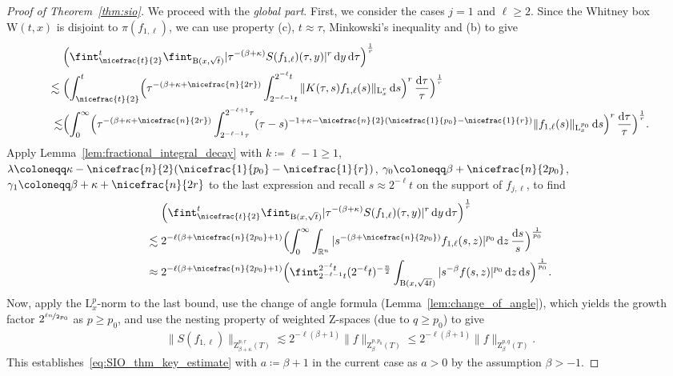 \documentclass[11pt, leqno]{amsart}
\theoremstyle{definition}
\newcommand{\R}{\mathbb{R}}
\renewcommand{\L}{\mathrm{L}}
\newcommand{\Z}{\mathrm{Z}}
\newcommand{\WB}{\mathrm{W}}
\renewcommand{\d}{\,\mathrm{d}}
\newcommand{\ddtau}{\,\frac{\mathrm{d}\tau}{\tau}}
\newcommand{\dds}{\,\frac{\mathrm{d}s}{s}}
\newcommand{\B}{\mathrm{B}}
\begin{document}
\begin{proof}[Proof of Theorem~\ref{thm:sio}]
		We proceed with the \emph{global part}. First, we consider the cases $j = 1$ and $\ell \geq 2$. Since the Whitney box $\WB(t,x)$ is disjoint to $\pi(f_{1,\ell})$, we can use property (c), $t \approx \tau$, Minkowski's inequality and (b) to give
		\begin{align}
			&\Bigl( \fint_{\nicefrac{t}{2}}^t \fint_{\B(x,\sqrt{t})} |\tau^{-(\beta + \kappa)} S(f_{1,\ell})(\tau,y)|^r \d y \d \tau \Bigr)^\frac{1}{r} \\
			\lesssim{} &\Bigl( \int_{\nicefrac{t}{2}}^t \Bigl( \tau^{-(\beta + \kappa + \nicefrac{n}{2r})} \int_{2^{-\ell-1} t}^{2^{-\ell} t} \| K(\tau,s)f_{1,\ell}(s) \|_{\L^r_x} \d s \Bigr)^r \ddtau \Bigr)^\frac{1}{r} \\
			\lesssim &\Bigl( \int_{0}^\infty \Bigl( \tau^{-(\beta + \kappa + \nicefrac{n}{2r})} \int_{2^{-\ell-1} \tau}^{2^{-\ell+1} \tau} (\tau-s)^{-1 + \kappa -\nicefrac{n}{2}(\nicefrac{1}{p_0} - \nicefrac{1}{r})} \| f_{1,\ell}(s) \|_{\L^{p_0}_x} \d s \Bigr)^r \ddtau \Bigr)^\frac{1}{r}.
		\end{align}
		Apply Lemma~\ref{lem:fractional_integral_decay} with $k \coloneqq \ell - 1 \geq 1$, $\lambda \coloneqq \kappa - \nicefrac{n}{2}(\nicefrac{1}{p_0} - \nicefrac{1}{r})$, $\gamma_0 \coloneqq \beta + \nicefrac{n}{2p_0}$, $\gamma_1 \coloneqq \beta + \kappa + \nicefrac{n}{2r}$ to the last expression and recall $s \approx 2^{-\ell} t$ on the support of $f_{j,\ell}$, to find
		\begin{align}
			&\Bigl( \fint_{\nicefrac{t}{2}}^t \fint_{\B(x,\sqrt{t})} |\tau^{-(\beta + \kappa)} S(f_{1,\ell})(\tau,y)|^r \d y \d \tau \Bigr)^\frac{1}{r} \\
			\lesssim{} &2^{-\ell(\beta + \nicefrac{n}{2p_0} + 1)} \Bigl( \int_0^\infty \int_{\R^n} |s^{-(\beta + \nicefrac{n}{2p_0})} f_{1,\ell}(s,z)|^{p_0} \d z \dds \Bigr)^\frac{1}{p_0} \\
			\approx{} &2^{-\ell(\beta + \nicefrac{n}{2p_0} + 1)} \Bigl( \fint_{2^{-\ell-1} t}^{2^{-\ell} t} (2^{-\ell} t)^{-\frac{n}{2}} \int_{\B(x, \sqrt{4t})} |s^{-\beta} f(s,z)|^{p_0} \d z \d s \Bigr)^\frac{1}{p_0}.
		\end{align}
		Now, apply the $\L^p_{x}$-norm to the last bound, use the change of angle formula (Lemma~\ref{lem:change_of_angle}), which yields the growth factor $2^{\nicefrac{\ell n}{2p_0}}$ as $p \geq p_0$, and use the nesting property of weighted $\Z$-spaces (due to $q \geq p_0$) to give
		\begin{align}
			\| S(f_{1,\ell}) \|_{\Z^{p,r}_{\beta + \kappa}(T)} \lesssim 2^{-\ell(\beta + 1)} \| f \|_{\Z^{p,p_0}_\beta(T)} \leq 2^{-\ell(\beta + 1)} \| f \|_{\Z^{p,q}_\beta(T)}.
		\end{align}
		This establishes~\eqref{eq:SIO_thm_key_estimate} with $a \coloneqq \beta + 1$ in the current case as $a>0$ by the assumption $\beta > -1$.


\end{proof}
\end{document}
